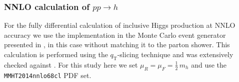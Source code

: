 \subsubsection{NNLO calculation of $pp\to h$}
\label{sec:hjetscomp:tools:fo:sherpa}

For the fully differential calculation of inclusive Higgs production 
at NNLO accuracy we use the implementation in the \Sherpa Monte Carlo 
event generator presented in \cite{Hoche:2014dla}, in this case without 
matching it to the parton shower. This calculation is performed using the 
$q_\text{T}$-slicing technique and was extensively 
checked against \HNNLO \cite{Catani:2007vq}. For this study here we set 
$\mu_R=\mu_F=\tfrac{1}{2}\,m_h$ and use the \texttt{MMHT2014nnlo68cl} 
PDF set. 

